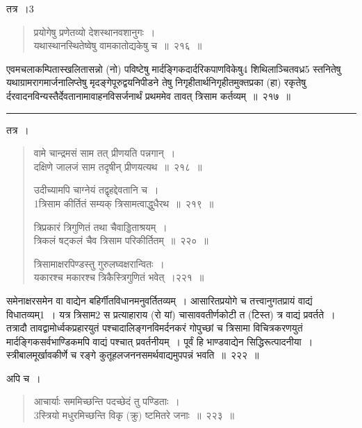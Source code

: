 \documentclass[11pt, openany]{book}
\begin{document}
\noindent
{\qt तत्र~।3}

\begin{quote}
{\na प्रयोगेषु प्रणेतव्यो देशस्थानवशानुगः~।\\
 यथास्थानस्थितेष्वेषु वामकातोद्यकेषु च~॥~२१६~॥}
\end{quote}

{\qt एवमचलाकम्पितास्खलितासन्नो (नो) पविष्टेषु  मार्दङ्गिकदार्दरिकपाणविकेषु4 शिथिलाञ्चितवध्र5 स्तनितेषु यथाग्रामरागमार्जनालिप्तेषु मृदङ्गेपूरुद्वयनिपीडने तेषु निगृहीतार्थनिगृहीतमुक्तप्रका (हा) रकृतेषु र्दरवादनविन्यस्तैर्देवतानामावाहनविसर्जनार्थं प्रथममेव तावत् त्रिसाम कर्तव्यम्~॥~२१७~॥}\\

\hrule


\newpage

तत्र~। 

\begin{quote}
{\na  वामे चान्द्रमसं साम तत् प्रीणयति पन्नगान्~।\\
 दक्षिणे जालजं साम तदृषीन् प्रीणयत्यथ~॥~२१८~॥

 उदीच्यामपि चाग्नेयं तद्वृहद्देवतानि च~।\\
 1त्रिसाम कीर्तितं सम्यक् त्रिसामत्वाद्धुधैरथ~॥~२१९~॥

 त्रिप्रकारं त्रिगुणितं तथा चैवाड्डिताश्रयम्~।\\
 त्रिकलं षट्कलं चैव त्रिसाम परिकीर्तितम्~॥~२२०~॥

 त्रिसामाक्षरपिण्डस्तु गुरुलघ्वक्षरान्वितः~।\\
 यकारश्च मकारश्च त्रिकैस्त्रिगुणितं भवेत्~।२२१~॥}
\end{quote}


\newpage

\noindent
{\qt समेनाक्षरसमेन वा वाद्येन बहिर्गीतविधानमनुवर्तितव्यम्~। आसारितप्रयोगे च तत्त्वानुगतप्रायं वाद्यं विधातव्यम्1~। यत्र त्रिसाम2 स प्रत्याहाराय (रो यां) चासाववतीर्णकोटी त (टिस्त) त्र वाद्यं प्रवर्तते~। तत्रादौ तावद्वामोर्ध्वकप्रहारयुतं पश्चादालिङ्गनविमर्दनकरं गोपुच्छां च त्रिसामा विचित्रकरणयुतं मार्दङ्गिकसर्वभाण्डिकमपि वाद्यं पश्चात् प्रवर्तनीयम्~। पूर्वं हि भाण्डवाद्येन सिद्धिरूत्पादनीया~। स्त्रीबालमूर्खावकीर्णे च रङ्गे कुतूहलजननसमर्थवाद्यमुपपन्नं भवति~॥~२२२~॥}

\noindent
{\qt अपि च~।}

\begin{quote}
{\na  आचार्याः सममिच्छन्ति पदच्छेदं तु पण्डिताः~।\\
 3स्त्रियो मधुरमिच्छन्ति विकृ (क्रु) ष्टमितरे जनाः~॥~२२३~॥}
\end{quote}
\end{document}
